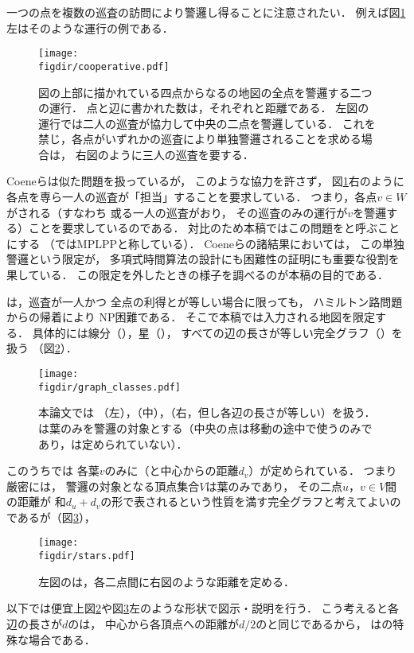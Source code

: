 一つの点を複数の巡査の訪問により警邏し得ることに注意されたい．
例えば図\ref{figure: cooperative}左はそのような運行の例である．
\begin{figure}
  \centering
  \texttt{[image: \\figdir/cooperative.pdf]}
  \caption{図の上部に描かれている四点からなる{\graphLine}の地図の全点を警邏する二つの運行．
    点と辺に書かれた数は，それぞれ{\maxIdletime}と距離である．
    左図の運行では二人の巡査が協力して中央の二点を警邏している．
    これを禁じ，各点がいずれかの巡査により単独警邏されることを求める場合は，
    右図のように三人の巡査を要する．}
  \label{figure: cooperative}
\end{figure}
Coeneら\cite{coene2011charlemagne}は似た問題を扱っているが，
このような協力を許さず，
図\ref{figure: cooperative}右のように
各点を専ら一人の巡査が「担当」することを要求している．
つまり，各点$v \in W$がされる（すなわち
或る一人の巡査がおり，
その巡査のみの運行が$v$を警邏する）ことを要求しているのである．
対比のため本稿ではこの問題をと呼ぶことにする
（\cite{coene2011charlemagne}ではMPLPPと称している）．
Coeneら\cite{coene2011charlemagne}の諸結果においては，
この単独警邏という限定が，
多項式時間算法の設計にも困難性の証明にも重要な役割を果している．
この限定を外したときの様子を調べるのが本稿の目的である．

{\patProb}は，巡査が一人かつ
全点の利得と{\maxIdletime}が等しい場合に限っても，
ハミルトン路問題からの帰着により
NP困難である\cite[Theorem~8]{coene2011charlemagne}．
そこで本稿では入力される地図を限定する．
具体的には線分（{\graphLine}），星（{\graphStar}），
すべての辺の長さが等しい完全グラフ（{\graphUnit}）を扱う
（図\ref{figure: graph_classes}）．
\begin{figure}
  \centering
  \texttt{[image: \\figdir/graph\_classes.pdf]}
  \caption{本論文では
    {\graphLine}（左），{\graphStar}（中），{\graphUnit}（右，但し各辺の長さが等しい）を扱う．
    {\graphStar}は葉のみを警邏の対象とする（中央の点は移動の途中で使うのみであり，{\maxIdletime}は定められていない）．}
  \label{figure: graph_classes}
\end{figure}
このうち{\graphStar}では
各葉$v$のみに{\maxIdletime}（と中心からの距離$d _v$）が定められている．
つまり厳密には，
警邏の対象となる頂点集合$V$は葉のみであり，
その二点$u$，$v \in V$間の距離が
和$d _u + d _v$の形で表されるという性質を満す完全グラフと考えてよいのであるが（図\ref{figure: stars}），
\begin{figure}
  \centering
  \texttt{[image: \\figdir/stars.pdf]}
  \caption{左図の{\graphStar}は，各二点間に右図のような距離を定める．}
  \label{figure: stars}
\end{figure}
以下では便宜上図\ref{figure: graph_classes}や図\ref{figure: stars}左のような形状で図示・説明を行う．
こう考えると各辺の長さが$d$の{\graphUnit}は，
中心から各頂点への距離が$d/2$の{\graphStar}と同じであるから，
{\graphUnit}は{\graphStar}の特殊な場合である．

